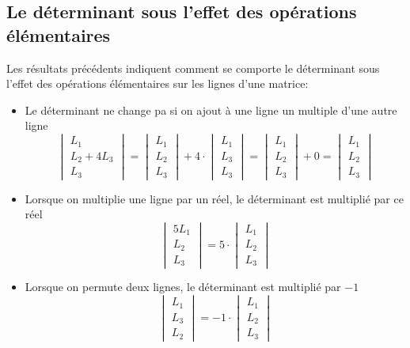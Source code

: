 \subsection{Le déterminant sous l'effet des opérations élémentaires}
%
Les résultats précédents indiquent comment se comporte le déterminant sous l'effet des opérations élémentaires sur les lignes d'une matrice:
\begin{itemize}
  \item Le déterminant ne change pa si on ajout à une ligne un multiple d'une autre ligne
    $$\begin{vmatrix} L_1 \\ L_2 + 4 L_3 \\ L_3 \end{vmatrix} 
      = \begin{vmatrix} L_1 \\ L_2 \\ L_3 \end{vmatrix} + 4 \cdot \begin{vmatrix} L_1 \\ L_3 \\ L_3 \end{vmatrix}
      = \begin{vmatrix} L_1 \\ L_2 \\ L_3 \end{vmatrix} + 0
      = \begin{vmatrix} L_1 \\ L_2 \\ L_3 \end{vmatrix}$$
      
  \item Lorsque on multiplie une ligne par un réel, le déterminant est multiplié par ce réel
    $$\begin{vmatrix} 5 L_1 \\ L_2 \\ L_3 \end{vmatrix} = 5 \cdot \begin{vmatrix} L_1 \\ L_2 \\ L_3 \end{vmatrix}$$
    
  \item Lorsque on permute deux lignes, le déterminant est multiplié par $-1$
    $$\begin{vmatrix} L_1 \\ L_3 \\ L_2 \end{vmatrix} = -1 \cdot \begin{vmatrix} L_1 \\ L_2 \\ L_3 \end{vmatrix}$$
\end{itemize}

